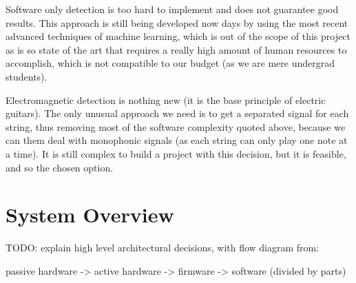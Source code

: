 Software only detection is too hard to implement and does not guarantee good results.
This approach is still being developed now days by using the most recent advanced
techniques of machine learning, which is out of the scope of this project as is so
state of the art that requires a really high amount of human resources to accomplish,
which is not compatible to our budget (as we are mere undergrad students). 

Electromagnetic detection is nothing new (it is the base principle of electric guitars).
The only unusual approach we need is to get a separated signal for each string, thus
removing most of the software complexity quoted above, because we can them deal
with monophonic signals (as each string can only play one note at a time). It is
still complex to build a project with this decision, but it is feasible, and so
the chosen option.

\section{System Overview}
TODO: explain high level architectural decisions, with flow diagram from: 

passive hardware  -> active hardware -> firmware -> software (divided by parts)